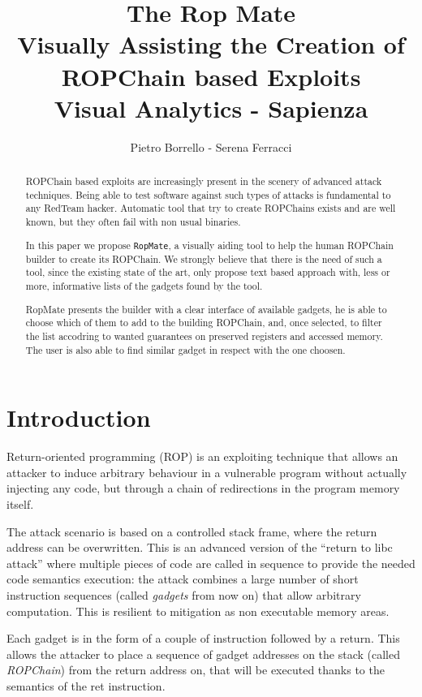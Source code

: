 \documentclass[twocolumn, 11pt]{article}
\title{{\Large \bf The Rop Mate \\ \large Visually Assisting the Creation of ROPChain based Exploits}  \\{\medskip\normalfont\normalsize  Visual Analytics -  Sapienza}}
\author{Pietro Borrello - Serena Ferracci}
\date{}
\begin{document}
\maketitle

\begin{abstract}
ROPChain based exploits are increasingly present in the scenery of advanced attack techniques. 
Being able to test software against such types of attacks is fundamental to any RedTeam hacker. Automatic tool that try to create ROPChains exists and are well known, but they often fail with non usual binaries. 

In this paper we propose \texttt{RopMate}, a visually aiding tool to help the human ROPChain builder to create its ROPChain. We strongly believe that there is the need of such a tool, since the existing state of the art, only propose text based approach with, less or more, informative lists of the gadgets found by the tool.

RopMate presents the builder with a clear interface of available gadgets, he is able to choose which of them to add to the building ROPChain, and, once selected, to filter the list accodring to wanted guarantees on preserved registers and accessed memory. The user is also able to find similar gadget in respect with the one choosen.
\end{abstract}

\section{Introduction}
Return-oriented programming (ROP) is an exploiting technique that allows an attacker to induce arbitrary behaviour in a vulnerable program without actually injecting any code, but through a chain of redirections in the program memory itself. \cite{rop}

The attack scenario is based on a controlled stack frame, where the return address can be overwritten. This is an advanced version of the ``return to libc attack'' \cite{libc} where multiple pieces of code are called in sequence to provide the needed code semantics execution: the attack combines a large number of short instruction sequences (called \textit{gadgets} from now on) that allow arbitrary computation. This is resilient to mitigation as non executable memory areas.

Each gadget is in the form of a couple of instruction followed by a return. This allows the attacker to place a sequence of gadget addresses on the stack (called \textit{ROPChain}) from the return address on, that will be executed thanks to the semantics of the ret instruction.
\end{document}
